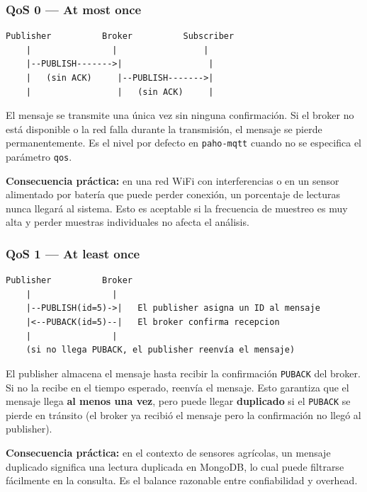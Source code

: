 \documentclass[12pt,a4paper]{article}
\begin{document}
\subsubsection{QoS 0 — At most once}

\begin{lstlisting}[style=texto]
Publisher          Broker          Subscriber
    |                |                 |
    |--PUBLISH------->|                 |
    |   (sin ACK)     |--PUBLISH------->|
    |                 |   (sin ACK)     |
\end{lstlisting}

El mensaje se transmite una única vez sin ninguna confirmación. Si el broker
no está disponible o la red falla durante la transmisión, el mensaje se pierde
permanentemente. Es el nivel por defecto en \texttt{paho-mqtt} cuando no se
especifica el parámetro \texttt{qos}.

\textbf{Consecuencia práctica:} en una red WiFi con interferencias o en un sensor
alimentado por batería que puede perder conexión, un porcentaje de lecturas nunca
llegará al sistema. Esto es aceptable si la frecuencia de muestreo es muy alta
y perder muestras individuales no afecta el análisis.

\subsubsection{QoS 1 — At least once}

\begin{lstlisting}[style=texto]
Publisher          Broker
    |                |
    |--PUBLISH(id=5)->|   El publisher asigna un ID al mensaje
    |<--PUBACK(id=5)--|   El broker confirma recepcion
    |                |
    (si no llega PUBACK, el publisher reenvía el mensaje)
\end{lstlisting}

El publisher almacena el mensaje hasta recibir la confirmación \texttt{PUBACK}
del broker. Si no la recibe en el tiempo esperado, reenvía el mensaje. Esto
garantiza que el mensaje llega \textbf{al menos una vez}, pero puede llegar
\textbf{duplicado} si el \texttt{PUBACK} se pierde en tránsito (el broker ya
recibió el mensaje pero la confirmación no llegó al publisher).

\textbf{Consecuencia práctica:} en el contexto de sensores agrícolas, un mensaje
duplicado significa una lectura duplicada en MongoDB, lo cual puede filtrarse
fácilmente en la consulta. Es el balance razonable entre confiabilidad y overhead.
\end{document}
